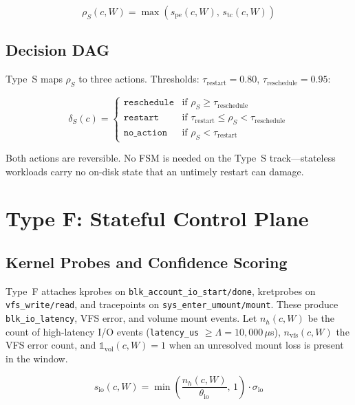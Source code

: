 \documentclass[conference]{IEEEtran}
\begin{document}
\begin{equation}
\rho_S(c, W) = \max(s_{\mathrm{pe}}(c, W),\, s_{\mathrm{tc}}(c, W))
\label{eq:rhoS}
\end{equation}

\subsection{Decision DAG}

Type~S maps $\rho_S$ to three actions. Thresholds: $\tau_{\mathrm{restart}} = 0.80$, $\tau_{\mathrm{reschedule}} = 0.95$:

\begin{equation*}
\delta_S(c) =
\begin{cases}
\texttt{reschedule} & \text{if } \rho_S \geq \tau_{\mathrm{reschedule}} \\
\texttt{restart}    & \text{if } \tau_{\mathrm{restart}} \leq \rho_S < \tau_{\mathrm{reschedule}} \\
\texttt{no\_action} & \text{if } \rho_S < \tau_{\mathrm{restart}}
\end{cases}
\end{equation*}

Both actions are reversible. No FSM is needed on the Type~S track---stateless workloads carry no on-disk state that an untimely restart can damage.

\section{Type F: Stateful Control Plane}
\label{sec:typef}

\subsection{Kernel Probes and Confidence Scoring}

Type~F attaches kprobes on \texttt{blk\_account\_io\_start/done}, kretprobes on \texttt{vfs\_write/read}, and tracepoints on \texttt{sys\_enter\_umount/mount}. These produce \texttt{blk\_io\_latency}, VFS error, and volume mount events. Let $n_h(c, W)$ be the count of high-latency I/O events (\texttt{latency\_us} $\geq \Lambda = 10{,}000\,\mu$s), $n_{\mathrm{vfs}}(c, W)$ the VFS error count, and $\mathbb{1}_{\mathrm{vol}}(c, W) = 1$ when an unresolved mount loss is present in the window.

\begin{equation}
s_{\mathrm{io}}(c, W) = \min\!\left(\frac{n_h(c, W)}{\theta_{\mathrm{io}}},\, 1\right) \cdot \sigma_{\mathrm{io}}
\label{eq:sio}
\end{equation}
\end{document}
